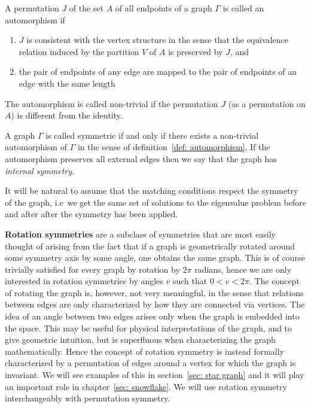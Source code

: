 \begin{definition}\label{def: automorphism}
  A permutation $J$ of the set $A$ of all endpoints of a graph $\Gamma$ is called an automorphism if
  \begin{enumerate}[(1)]
    \item $J$ is consistent with the vertex structure in the sense that the equivalence relation induced by the partition $V$ of $A$ is preserved by $J$, and
    \item the pair of endpoints of any edge are mapped to the pair of endpoints of an edge with the same length
  \end{enumerate}
  The automorphism is called non-trivial if the permutation $J$ (as a permutation on $A$) is different from the identity.
\end{definition}

\begin{definition}
  A graph $\Gamma$ is called symmetric if and only if there exists a non-trivial automorphism of $\Gamma$ in the sense of definition~\ref{def: automorphism}. If the automorphism preserves all external edges then we say that the graph has \emph{internal symmetry}.
\end{definition}

It will be natural to assume that the matching conditions respect the symmetry of the graph, i.e\ we get the same set of solutions to the eigenvalue problem before and after after the symmetry has been applied.

\textbf{Rotation symmetries} are a subclass of symmetries that are most easily thought of arising from the fact that if a graph is geometrically rotated around some symmetry axis by some angle, one obtains the same graph. This is of course trivially satisfied for every graph by rotation by $2\pi$ radians, hence we are only interested in rotation symmetries by angles $v$ such that $0 < v < 2\pi$. The concept of rotating the graph is, however, not very meaningful, in the sense that relations between edges are only characterized by how they are connected via vertices. The idea of an angle between two edges arises only when the graph is embedded into the space. This may be useful for physical interpretations of the graph, and to give geometric intuition, but is superfluous when characterizing the graph mathematically. Hence the concept of rotation symmetry is instead formally characterized by a permutation of edges around a vertex for which the graph is invariant. We will see examples of this in section~\ref{sec: star graph} and it will play an important role in chapter~\ref{sec: snowflake}. We will use rotation symmetry interchangeably with permutation symmetry.

